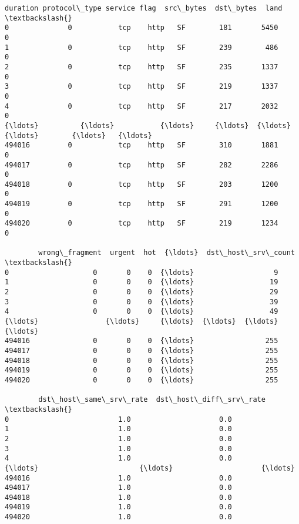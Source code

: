 \documentclass[11pt]{article}
\makeatletter
\newcommand{\boxspacing}{\kern\kvtcb@left@rule\kern\kvtcb@boxsep}
\newcommand{\prompt}[4]{
        {\ttfamily\llap{{\color{#2}[#3]:\hspace{3pt}#4}}\vspace{-\baselineskip}}
    }
\makeatother
\begin{document}
            \begin{tcolorbox}[breakable, size=fbox, boxrule=.5pt, pad at break*=1mm, opacityfill=0]
\prompt{Out}{outcolor}{ }{\boxspacing}
\begin{Verbatim}[commandchars=\\\{\}]
        duration protocol\_type service flag  src\_bytes  dst\_bytes  land  \textbackslash{}
0              0           tcp    http   SF        181       5450     0
1              0           tcp    http   SF        239        486     0
2              0           tcp    http   SF        235       1337     0
3              0           tcp    http   SF        219       1337     0
4              0           tcp    http   SF        217       2032     0
{\ldots}          {\ldots}           {\ldots}     {\ldots}  {\ldots}        {\ldots}        {\ldots}   {\ldots}
494016         0           tcp    http   SF        310       1881     0
494017         0           tcp    http   SF        282       2286     0
494018         0           tcp    http   SF        203       1200     0
494019         0           tcp    http   SF        291       1200     0
494020         0           tcp    http   SF        219       1234     0

        wrong\_fragment  urgent  hot  {\ldots}  dst\_host\_srv\_count  \textbackslash{}
0                    0       0    0  {\ldots}                   9
1                    0       0    0  {\ldots}                  19
2                    0       0    0  {\ldots}                  29
3                    0       0    0  {\ldots}                  39
4                    0       0    0  {\ldots}                  49
{\ldots}                {\ldots}     {\ldots}  {\ldots}  {\ldots}                 {\ldots}
494016               0       0    0  {\ldots}                 255
494017               0       0    0  {\ldots}                 255
494018               0       0    0  {\ldots}                 255
494019               0       0    0  {\ldots}                 255
494020               0       0    0  {\ldots}                 255

        dst\_host\_same\_srv\_rate  dst\_host\_diff\_srv\_rate  \textbackslash{}
0                          1.0                     0.0
1                          1.0                     0.0
2                          1.0                     0.0
3                          1.0                     0.0
4                          1.0                     0.0
{\ldots}                        {\ldots}                     {\ldots}
494016                     1.0                     0.0
494017                     1.0                     0.0
494018                     1.0                     0.0
494019                     1.0                     0.0
494020                     1.0                     0.0


\end{Verbatim}
\end{tcolorbox}
\end{document}

